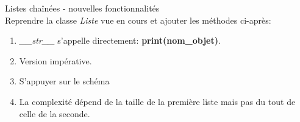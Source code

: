 \documentclass[a4paper,11pt]{article}
\begin{document}
\begin{Form}
\begin{exo}
Listes chaînées - nouvelles fonctionnalités\\
Reprendre la classe \emph{Liste} vue en cours et ajouter les méthodes ci-après:
\begin{enumerate}
\item \emph{\_\_str\_\_} s'appelle directement: \textbf{print(nom\_objet)}.

\item Version impérative.

\item S'appuyer sur le schéma

\item La complexité dépend de la taille de la première liste mais pas du tout de celle de la seconde.
\end{enumerate}
\end{exo}
\end{Form}
\end{document}
